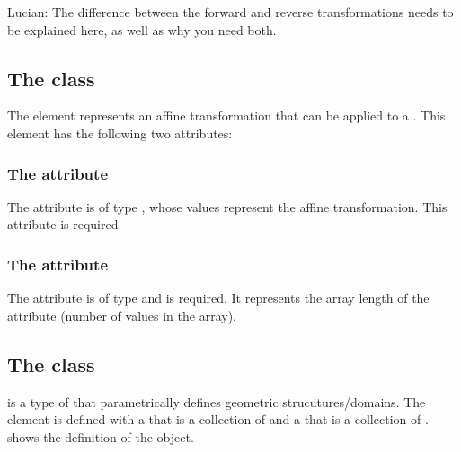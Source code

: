 {\color{red} Lucian: \notice The difference between the forward and reverse transformations needs to be explained here, as well as why you need both.}


\subsection{The  class}
\label{TransformationComponent-class}
The \TransformationComponent element represents an affine transformation that can be applied to a \CSGNode. This element has the following two attributes:

\subsubsection{The  attribute}
The  attribute is of type , whose values represent the affine transformation. This attribute is required.

\subsubsection{The  attribute}
The  attribute is of type  and is required. It represents the array length of the  attribute (number of values in the  array).


\subsection{The  class}
\label{ParametricGeometry-class}
\label{ListOfSpatialPoints-class}
\label{ListOfParametricObjects-class}
\ParametricGeometry is a type of \GeometryDefinition that parametrically defines geometric strucutures/domains. The \ParametricGeometry element is defined with a  that is a collection of \ParametricObjects and a  that is a collection of \SpatialPoints.  shows the definition of the \ParametricGeometry object.

